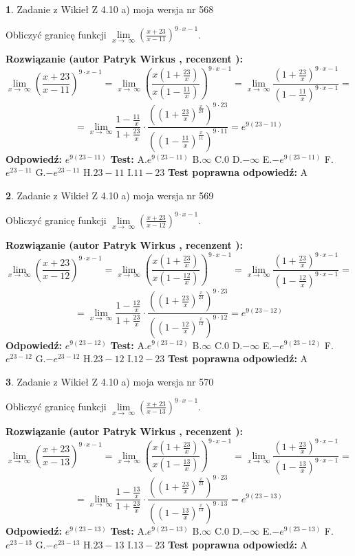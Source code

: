 \documentclass[12pt, a4paper]{article}
\theoremstyle{definition} %
\newtheorem{zad}{}
\newcommand{\zadStart}[1]{\begin{zad}#1\newline}
\newcommand{\zadStop}{\end{zad}}
\newcommand{\rozwStart}[2]{\noindent \textbf{Rozwiązanie (autor #1 , recenzent #2): }\newline}
\newcommand{\rozwStop}{\newline}
\newcommand{\odpStart}{\noindent \textbf{Odpowiedź:}\newline}
\newcommand{\odpStop}{\newline}
\newcommand{\testStart}{\noindent \textbf{Test:}\newline}
\newcommand{\testStop}{\newline}
\newcommand{\kluczStart}{\noindent \textbf{Test poprawna odpowiedź:}\newline}
\newcommand{\kluczStop}{\newline}
\begin{document}
\zadStart{Zadanie z Wikieł Z 4.10 a) moja wersja nr 568}


Obliczyć granicę funkcji  $\lim\limits_{x\to\ \infty}(\frac{x+23}{x-11})^{9\cdot x-1}$.
\zadStop
\rozwStart{Patryk Wirkus}{}
$$\lim\limits_{x\to\ \infty}(\frac{x+23}{x-11})^{9\cdot x-1} = \lim\limits_{x\to\ \infty}(\frac{x(1+\frac{23}{x})}{x(1-\frac{11}{x})})^{9\cdot x-1}=\lim\limits_{x\to\ \infty}\frac{(1+\frac{23}{x})^{9\cdot x-1}}{(1-\frac{11}{x})^{9\cdot x-1}}=$$
$$=\lim\limits_{x\to\ \infty}\frac{1-\frac{11}{x}}{1+\frac{23}{x}}\cdot\frac{((1+\frac{23}{x})^{\frac{x}{23}})^{9\cdot23}}{((1-\frac{11}{x})^{\frac{x}{11}})^{9\cdot11}}=e^{9(23-11)}$$
\rozwStop
\odpStart
$e^{9(23-11)}$
\odpStop
\testStart
A.$e^{9(23-11)}$ B.$\infty$ C.$0$ D.$-\infty$ E.$-e^{9(23-11)}$
F.$e^{23-11}$ G.$-e^{23-11}$
H.$23-11$
I.$11-23$
\testStop
\kluczStart
A
\kluczStop



\zadStart{Zadanie z Wikieł Z 4.10 a) moja wersja nr 569}


Obliczyć granicę funkcji  $\lim\limits_{x\to\ \infty}(\frac{x+23}{x-12})^{9\cdot x-1}$.
\zadStop
\rozwStart{Patryk Wirkus}{}
$$\lim\limits_{x\to\ \infty}(\frac{x+23}{x-12})^{9\cdot x-1} = \lim\limits_{x\to\ \infty}(\frac{x(1+\frac{23}{x})}{x(1-\frac{12}{x})})^{9\cdot x-1}=\lim\limits_{x\to\ \infty}\frac{(1+\frac{23}{x})^{9\cdot x-1}}{(1-\frac{12}{x})^{9\cdot x-1}}=$$
$$=\lim\limits_{x\to\ \infty}\frac{1-\frac{12}{x}}{1+\frac{23}{x}}\cdot\frac{((1+\frac{23}{x})^{\frac{x}{23}})^{9\cdot23}}{((1-\frac{12}{x})^{\frac{x}{12}})^{9\cdot12}}=e^{9(23-12)}$$
\rozwStop
\odpStart
$e^{9(23-12)}$
\odpStop
\testStart
A.$e^{9(23-12)}$ B.$\infty$ C.$0$ D.$-\infty$ E.$-e^{9(23-12)}$
F.$e^{23-12}$ G.$-e^{23-12}$
H.$23-12$
I.$12-23$
\testStop
\kluczStart
A
\kluczStop



\zadStart{Zadanie z Wikieł Z 4.10 a) moja wersja nr 570}


Obliczyć granicę funkcji  $\lim\limits_{x\to\ \infty}(\frac{x+23}{x-13})^{9\cdot x-1}$.
\zadStop
\rozwStart{Patryk Wirkus}{}
$$\lim\limits_{x\to\ \infty}(\frac{x+23}{x-13})^{9\cdot x-1} = \lim\limits_{x\to\ \infty}(\frac{x(1+\frac{23}{x})}{x(1-\frac{13}{x})})^{9\cdot x-1}=\lim\limits_{x\to\ \infty}\frac{(1+\frac{23}{x})^{9\cdot x-1}}{(1-\frac{13}{x})^{9\cdot x-1}}=$$
$$=\lim\limits_{x\to\ \infty}\frac{1-\frac{13}{x}}{1+\frac{23}{x}}\cdot\frac{((1+\frac{23}{x})^{\frac{x}{23}})^{9\cdot23}}{((1-\frac{13}{x})^{\frac{x}{13}})^{9\cdot13}}=e^{9(23-13)}$$
\rozwStop
\odpStart
$e^{9(23-13)}$
\odpStop
\testStart
A.$e^{9(23-13)}$ B.$\infty$ C.$0$ D.$-\infty$ E.$-e^{9(23-13)}$
F.$e^{23-13}$ G.$-e^{23-13}$
H.$23-13$
I.$13-23$
\testStop
\kluczStart
A
\kluczStop
\end{document}
